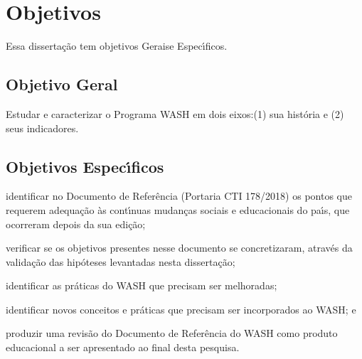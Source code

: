 \documentclass[
12pt,		%
openright,	%
twoside,  %
a4paper,			%
chapter=TITLE,		%
english,			%
french,				%
spanish,			%
brazil				%
]{USPSC-classe/USPSC}
\begin{document}
\section[Objetivos]{Objetivos}\label{Objetivos}
Essa disserta\c{c}\~ao tem objetivos  \textquotedbl Gerais\textquotedbl  e \textquotedbl Espec\'{\i}ficos\textquotedbl .

















\subsection[Objetivo Geral]{Objetivo Geral}\label{Objetivo Geral}
Estudar e caracterizar o Programa WASH em dois eixos:(1) sua hist\'oria e (2) seus indicadores.

















\subsection[Objetivos Espec\'{\i}ficos]{Objetivos Espec\'{\i}ficos}\label{Objetivos Espec\'{\i}ficos}



















\begin{alineas}
\item identificar no Documento de Refer\^encia (Portaria CTI 178/2018) os pontos que requerem adequa\c{c}\~ao \`as cont\'{\i}nuas mudan\c{c}as sociais e educacionais do pa\'{\i}s, que ocorreram depois da sua edi\c{c}\~ao;
\item verificar se os objetivos presentes nesse documento se concretizaram, atrav\'es da valida\c{c}\~ao das hip\'oteses levantadas nesta disserta\c{c}\~ao;
\item identificar as pr\'aticas do WASH que precisam ser melhoradas;
\item identificar novos conceitos e pr\'aticas que precisam ser incorporados ao WASH; e
\item produzir uma revis\~ao do Documento de Refer\^encia do WASH como produto educacional a ser apresentado ao final desta pesquisa.
\end{alineas}
\end{document}
